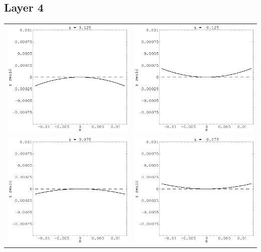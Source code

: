 \documentclass[12pt]{article}
\begin{document}
\pagebreak

\subsection*{Layer 4}
  \begin{tabular}{c c}
    \includegraphics[width=7.3 cm]{layer4_left3.eps} &
    \includegraphics[width=7.3 cm]{layer4_right3.eps} \\
    \includegraphics[width=7.3 cm]{layer4_left2.eps} &
    \includegraphics[width=7.3 cm]{layer4_right2.eps} \\

\end{tabular}
\end{document}

